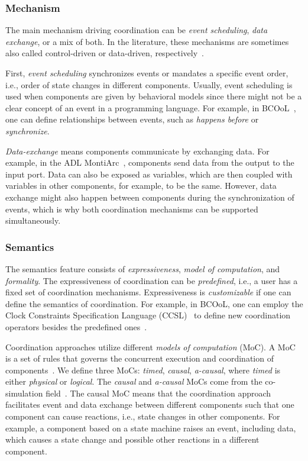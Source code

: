 \documentclass[runningheads]{llncs}
\begin{document}
\subsubsection{Mechanism} The main mechanism driving coordination can be \textit{event scheduling}, \textit{data exchange}, or a mix of both.
In the literature, these mechanisms are sometimes also called control-driven or data-driven, respectively~\cite{papadopoulosCoordinationModelsLanguages1998,varalarsenBCOolBehavioralCoordination2016}.

First, \textit{event scheduling} synchronizes events or mandates a specific event order, i.e., order of state changes in different components.
Usually, event scheduling is used when components are given by behavioral models since there might not be a clear concept of an event in a programming language.
For example, in BCOoL~\cite{varalarsenBehavioralCoordinationOperator2015}, one can define relationships between events, such as \textit{happens before} or \textit{synchronize}.

\textit{Data-exchange} means components communicate by exchanging data.
For example, in the ADL MontiArc~\cite{haberMontiArcArchitecturalModeling2014}, components send data from the output to the input port.
Data can also be exposed as variables, which are then coupled with variables in other components, for example, to be the same. %
However, data exchange might also happen between components during the synchronization of events, which is why both coordination mechanisms can be supported simultaneously.

\subsubsection{Semantics} The semantics feature consists of \textit{expressiveness}, \textit{model of computation}, and \textit{formality}.
The expressiveness of coordination can be \textit{predefined}, i.e., a user has a fixed set of coordination mechanisms.
Expressiveness is \textit{customizable} if one can define the semantics of coordination.
For example, in BCOoL, one can employ the Clock Constraints Specification Language (CCSL)~\cite{andreSyntaxSemanticsClock2009} to define new coordination operators besides the predefined ones~\cite{varalarsenBCOolBehavioralCoordination2016,varalarsenBehavioralCoordinationOperator2015}.

Coordination approaches utilize different \textit{models of computation} (MoC).
A MoC is a set of rules that governs the concurrent execution and coordination of components~\cite{ptolemaeusSystemDesignModeling2014}.
We define three MoCs: \textit{timed}, \textit{causal}, \textit{a-causal}, where \textit{timed} is either \textit{physical} or \textit{logical}.
The \textit{causal} and \textit{a-causal} MoCs come from the co-simulation field~\cite{gomesCoSimulationSurvey2019}.
The causal MoC means that the coordination approach facilitates event and data exchange between different components such that one component can cause reactions, i.e., state changes in other components.
For example, a component based on a state machine raises an event, including data, which causes a state change and possible other reactions in a different component.
\end{document}

